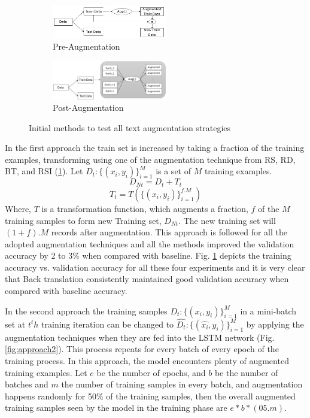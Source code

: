 \documentclass{article}
\begin{document}
\begin{figure}
  \begin{subfigure}{6cm}
    \centering\includegraphics[width=5cm]{approach1.jpg}
    \caption{Pre-Augmentation}
  \end{subfigure}
  \begin{subfigure}{6cm}
    \centering\includegraphics[width=5cm]{approach2.jpg}
    \caption{Post-Augmentation}
  \end{subfigure}
  \caption{Initial methods to test all text augmentation strategies}
  \label{fig:initialmethods}
\end{figure}


In the first approach the train set is increased by taking a fraction of the training examples, transforming using one of the augmentation technique from RS, RD, BT, and RSI (\ref{fig:initialmethods}). Let $D_t : \{(x_i, y_i)\}_{i=1}^M$ is a set of $M$ training examples.
\begin{equation}
D_{Nt} = D_t + T_t
\end{equation}
\begin{equation}
T_t = T(\{(x_i, y_i)\}_{i=1}^{f.M})
\end{equation}
Where, $T$ is a transformation function, which augments a fraction, $f$ of the $M$ training samples to form new Training set, $D_{Nt}$. The new training set will $(1+f).M$ records after augmentation. This approach is followed for all the adopted augmentation techniques and all the methods improved the validation accuracy by 2 to 3\% when compared with baseline. Fig. \ref{fig:initialmethods} depicts the training accuracy vs. validation accuracy for all these four experiments and it is very clear that Back translation consistently maintained good validation accuracy when compared with baseline accuracy.



In the second approach the training samples $D_t : \{(x_i, y_i)\}_{i=1}^M$ in a mini-batch set at $t^th$ training iteration can be changed to $\hat{D_t} : \{(\hat{x_i}, y_i)\}_{i=1}^M$ by applying the augmentation techniques when they are fed into the LSTM network (Fig. \ref{fig:approach2}). This process repeats for every batch of every epoch of the training process. In this approach, the model encounters plenty of augmented training examples. 
Let $e$ be the number of epochs, and $b$ be the number of batches and $m$ the number of training samples in every batch, and augmentation happens randomly for 50\% of the training samples, then the overall augmented training samples seen by the model in the training phase are $e * b * (05.m)$.
\end{document}
